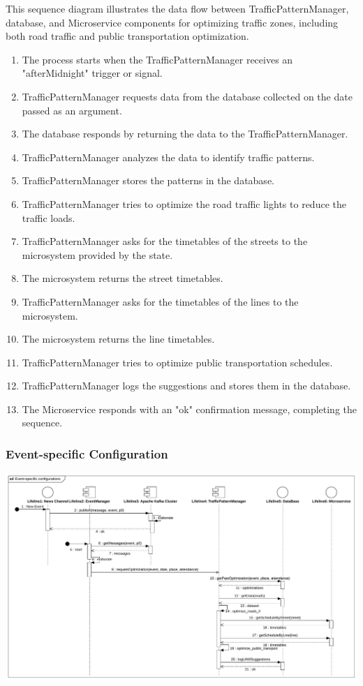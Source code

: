 \documentclass[12pt, a4paper, twoside, openright]{report}
\begin{document}
This sequence diagram illustrates the data flow between TrafficPatternManager, database, and Microservice components for optimizing traffic zones, including both road traffic and public transportation optimization.
\begin{enumerate}
  \item The process starts when the TrafficPatternManager receives an "afterMidnight" trigger or signal.
  \item TrafficPatternManager requests data from the database collected on the date passed as an argument.
  \item The database responds by returning the data to the TrafficPatternManager.
  \item TrafficPatternManager analyzes the data to identify traffic patterns.
  \item TrafficPatternManager stores the patterns in the database.
  \item TrafficPatternManager tries to optimize the road traffic lights to reduce the traffic loads.
  \item	TrafficPatternManager asks for the timetables of the streets to the microsystem provided by the state.
  \item	The microsystem returns the street timetables.
  \item	TrafficPatternManager asks for the timetables of the lines to the microsystem.
  \item	The microsystem returns the line timetables.
  \item TrafficPatternManager tries to optimize public transportation schedules.
  \item TrafficPatternManager logs the suggestions and stores them in the database.
  \item The Microservice responds with an "ok" confirmation message, completing the sequence.
\end{enumerate}

\subsubsection{Event-specific Configuration}


\includegraphics[width=\linewidth]{images/svg/event-specific_configurations.pdf}
\end{document}
